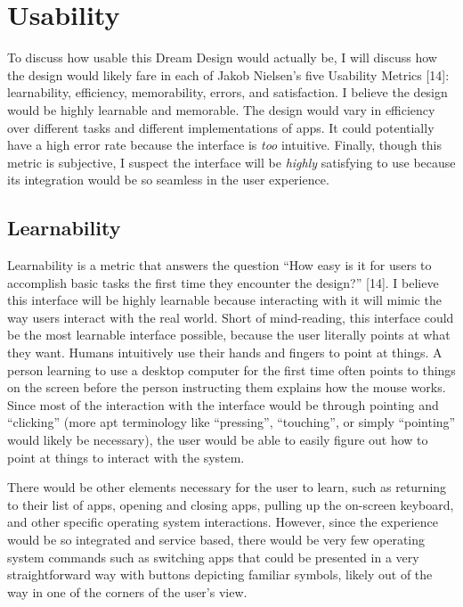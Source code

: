 \documentclass[a4paper,12pt]{article}
\begin{document}
\section{Usability}

To discuss how usable this Dream Design would actually be, I will discuss how the design would likely fare in each of Jakob Nielsen's five Usability Metrics [14]: learnability, efficiency, memorability, errors, and satisfaction. I believe the design would be highly learnable and memorable. The design would vary in efficiency over different tasks and different implementations of apps. It could potentially have a high error rate because the interface is \emph{too} intuitive. Finally, though this metric is subjective, I suspect the interface will be \emph{highly} satisfying to use because its integration would be so seamless in the user experience.

\subsection{Learnability}

Learnability is a metric that answers the question ``How easy is it for users to accomplish basic tasks the first time they encounter the design?'' [14]. I believe this interface will be highly learnable because interacting with it will mimic the way users interact with the real world. Short of mind-reading, this interface could be the most learnable interface possible, because the user literally points at what they want. Humans intuitively use their hands and fingers to point at things. A person learning to use a desktop computer for the first time often points to things on the screen before the person instructing them explains how the mouse works. Since most of the interaction with the interface would be through pointing and ``clicking'' (more apt terminology like ``pressing'', ``touching'', or simply ``pointing'' would likely be necessary), the user would be able to easily figure out how to point at things to interact with the system. 

There would be other elements necessary for the user to learn, such as returning to their list of apps, opening and closing apps, pulling up the on-screen keyboard, and other specific operating system interactions. However, since the experience would be so integrated and service based, there would be very few operating system commands such as switching apps that could be presented in a very straightforward way with buttons depicting familiar symbols, likely out of the way in one of the corners of the user's view.
\end{document}
